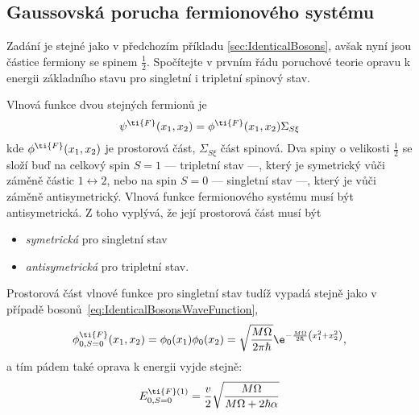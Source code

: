 \subsection{Gaussovská porucha fermionového systému}
\label{sec:GaussovskaPoruchaFermiony}
	Zadání je stejné jako v předchozím příkladu \ref{sec:IdenticalBosons}, avšak nyní jsou částice fermiony se spinem $\frac{1}{2}$.
	Spočítejte v prvním řádu poruchové teorie opravu k energii základního stavu pro singletní i tripletní spinový stav.
	
\begin{solution}
	Vlnová funkce dvou stejných fermionů je
	\begin{equation}
		\psi^{\ti{F}}(x_{1},x_{2})
			=\phi^{\ti{F}}(x_{1},x_{2})\Sigma_{S\xi}
	\end{equation}
	kde $\phi^{\ti{F}}(x_{1},x_{2})$ je prostorová část, $\Sigma_{S\xi}$ část spinová.
	Dva spiny o velikosti $\frac{1}{2}$ se složí buď na celkový spin $S=1$ --- tripletní stav ---, který je symetrický vůči záměně částic $1\leftrightarrow2$, nebo na spin $S=0$ --- singletní
	stav ---, který je vůči záměně antisymetrický.
	Vlnová funkce fermionového systému musí být antisymetrická.
	Z toho vyplývá, že její prostorová část musí být
	\begin{itemize}
		\item \emph{symetrická} pro singletní stav
		\item \emph{antisymetrická} pro tripletní stav.
	\end{itemize}
	Prostorová část vlnové funkce pro singletní stav tudíž vypadá stejně jako v případě bosonů~\eqref{eq:IdenticalBosonsWaveFunction},
	\begin{equation}
		\phi^{\ti{F}}_{0,S=0}(x_{1},x_{2})
			=\phi_{0}(x_{1})\phi_{0}(x_{2})
			=\sqrt{\frac{M\Omega}{2\pi\hbar}}\e^{-\frac{M\Omega}{2\hbar}\left(x_{1}^{2}+x_{2}^{2}\right)},
	\end{equation}
	a tím pádem také oprava k energii vyjde stejně:
	\begin{equation}
		E_{0,S=0}^{\ti{F}(1)}
			=\frac{v}{2}\sqrt{\frac{M\Omega}{M\Omega+2\hbar\alpha}}
	\end{equation}
	

\end{solution}
